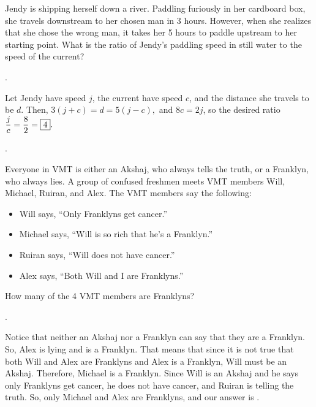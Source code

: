 \documentclass[11pt]{article}
\DeclareRobustCommand{\frac}[3][0pt]{%
  {\begingroup\hspace{#1}#2\hspace{#1}\endgroup\over\hspace{#1}#3\hspace{#1}}}
\begin{document}

\begin{problem}Jendy is shipping herself down a river. Paddling furiously in her cardboard box, she travels downstream to her chosen man in 3 hours. However, when she realizes that she chose the wrong man, it takes her 5 hours to paddle upstream to her starting point. What is the ratio of Jendy's paddling speed in still water to the speed of the current?
\end{problem}

\begin{answer} . \end{answer}
\begin{solution}
Let Jendy have speed $j$, the current have speed $c$, and the distance she travels to be $d$. Then, $3(j + c) = d = 5(j- c),$ and $8c = 2j$, so the desired ratio $\displaystyle \frac{j}{c} = \frac{8}{2} = \boxed{4}.$
\end{solution}.

\begin{problem}
Everyone in VMT is either an Akshaj, who always tells the truth, or a Franklyn, who always lies. A group of confused freshmen meets VMT members Will, Michael, Ruiran, and Alex. The VMT members say the following:
	\begin{itemize}
    	\item Will says, ``Only Franklyns get cancer.''
    	\item Michael says, ``Will is so rich that he's a Franklyn.''
    	\item Ruiran says, ``Will does not have cancer.''
    	\item Alex says, ``Both Will and I are Franklyns.''
	\end{itemize}
	How many of the 4 VMT members are Franklyns?
\end{problem}

\begin{answer} . \end{answer}
\begin{solution}
Notice that neither an Akshaj nor a Franklyn can say that they are a Franklyn. So, Alex is lying and is a Franklyn. That means that since it is not true that both Will and Alex are Franklyns and Alex is a Franklyn, Will must be an Akshaj. Therefore, Michael is a Franklyn. Since Will is an Akshaj and he says only Franklyns get cancer, he does not have cancer, and Ruiran is telling the truth. So, only Michael and Alex are Franklyns, and our answer is .
\end{solution}
\end{document}
